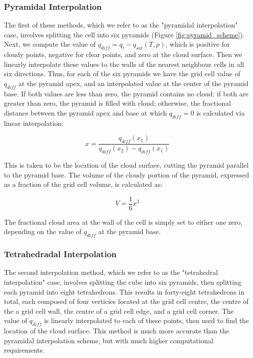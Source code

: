 \documentclass[12pt]{article}
\begin{document}
\subsubsection{Pyramidal Interpolation}

The first of these methods, which we refer to as the "pyramidal interpolation" 
case, involves splitting the cell into six pyramids  
(Figure \ref{fig:pyramid_scheme}).  Next, we compute the value of 
$q_{diff} = q_t - q_{sat}(T, p)$, which is positive for cloudy points, negative 
for clear points, and zero at the cloud surface.  Then we linearly interpolate 
these values to the walls of the nearest neighbour cells in all six directions. 
Thus, for each of the six pyramids we have the grid cell value of $q_{diff}$ at 
the pyramid apex, and an interpolated value at the center of the pyramid base.
If both values are less than zero, the pyramid contains no cloud; if both are 
greater than zero, the pyramid is filled with cloud; otherwise, the fractional 
distance between the pyramid apex and base at which $q_{diff} = 0$ is 
calculated via linear interpolation:

\begin{equation}
\label{eq:q_diff_interpolation}
x = \frac{q_{diff}(x_1)}{q_{diff}(x_2) - q_{diff}(x_1)}
\end{equation}

This is taken to be the location of the cloud surface, cutting the pyramid 
parallel to the pyramid base.  The volume of the cloudy portion of the pyramid,
expressed as a fraction of the grid cell volume, is calculated as:

\begin{equation}
V = \frac{1}{6}x^3
\end{equation}

The fractional cloud area at the wall of the cell is simply set to either one 
zero, depending on the value of $q_{diff}$ at the pyramid base.

\subsubsection{Tetrahedradal Interpolation}

The second interpolation method, which we refer to as the "tetrahedral 
interpolation" case, involves splitting the cube into six pyramids, then 
splitting each pyramid into eight tetrahedrons. This results in forty-eight 
tetrahedrons in total, each composed of four verticies located at the grid cell 
centre, the centre of the a grid cell wall, the centre of a grid cell edge, and 
a grid cell corner.  The value of $q_{diff}$ is linearly interpolated to each 
of these points, then used to find the location of the cloud surface.  This 
method is much more accurate than the pyramidal interpolation scheme, but with 
much higher computational requirements.
\end{document}
